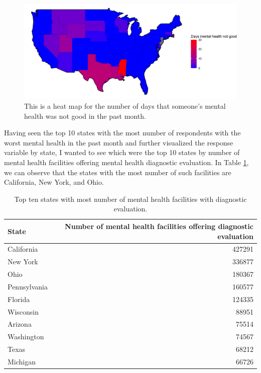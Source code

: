 \documentclass[
]{article}
\begin{document}
\begin{figure}[H]

{\centering \includegraphics[width=0.8\linewidth]{../results/response-map} 

}

\caption{This is a heat map for the number of days that someone's mental health was not good in the past month.}\label{fig:response-map}
\end{figure}

Having seen the top 10 states with the most number of respondents with the worst mental health in the past month and further visualized the response variable by state, I wanted to see which were the top 10 states by number of mental health facilities offering mental health diagnostic evaluation. In Table \ref{tab:top-10-states-mental-health-facilities}, we can observe that the states with the most number of such facilities are California, New York, and Ohio.

\begin{table}[H]

\caption{\label{tab:top-10-states-mental-health-facilities}Top ten states with most number of mental health facilities with diagnostic evaluation.}
\centering
\begin{tabular}[t]{lr}
\toprule
State & Number of mental health facilities offering diagnostic evaluation\\
\midrule
California & 427291\\
New York & 336877\\
Ohio & 180367\\
Pennsylvania & 160577\\
Florida & 124335\\
\addlinespace
Wisconsin & 88951\\
Arizona & 75514\\
Washington & 74567\\
Texas & 68212\\
Michigan & 66726\\
\bottomrule
\end{tabular}
\end{table}
\end{document}
